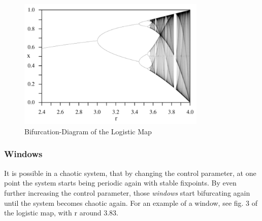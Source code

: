 \begin{figure}[H]
\centering \includegraphics[width=0.8\textwidth]{Bilder/logmap.png}
\caption{Bifurcation-Diagram of the Logistic Map}
\end{figure}

\subsubsection{Windows}

It is possible in a chaotic system, that by changing the control parameter, at one point the system starts being periodic again with stable fixpoints. By even further increasing the control parameter, those \emph{windows} start bifurcating again until the system becomes chaotic again. For an example of a window, see fig. 3 of the logistic map, with r around 3.83.


